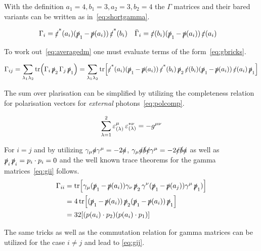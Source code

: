 With the definition \(a_1=4,b_1=3,a_2=3,b_2=4\) the \(\Gamma\)
matrices and their bared variants can be written as in~\eqref{eq:shortgamma}.

\begin{align}
  \label{eq:shortgamma}
  \Gamma_i &= \pses(a_i)(\ps_1 - \ps(a_i))\pses(b_i) & \bar{\Gamma}_i &= \pes(b_i)(\ps_1 - \ps(a_i))\pes(a_i)
\end{align}

To work out~\eqref{eq:averagedm} one must evaluate terms of the
form~\eqref{eq:gbricks}.

\begin{align}
  \label{eq:gbricks}
  \Gamma_{ij} = \sum_{\lambda_1\lambda_2} \tr(\Gamma_i\ps_2\Gamma_j\ps_1) =
  \sum_{\lambda_1\lambda_2} \tr[\pses(a_i)(\ps_1-\ps(a_i))\pses(b_i)\ps_2\pes(b_i)(\ps_1 - \ps(a_i))\pes(a_i)\ps_1]
\end{align}

The sum over plarisation can be simplified by utilizing the
completeness relation for polarisation vectors for \emph{external}
photons~\eqref{eq:polcomp}.

\begin{equation}
  \label{eq:polcomp}
  \sum_{\lambda=1}^{2}\pe_{(\lambda)}^\mu\pe_{(\lambda)}^{*\nu} = -g^{\mu\nu}
\end{equation}

For \(i=j\) and by utilizing \(\gamma_\mu\sl{a}\gamma^\mu=-2\sl{a}\),
 \(\gamma_\mu\sl{a}\sl{b}\sl{c}\gamma^\mu=-2\sl{c}\sl{b}\sl{a}\) as
well as \(\ps_i\ps_i=p_i\cdot p_i = 0\) and the well known trace
theorems for the gamma matrices~\eqref{eq:gii} follows.
\begin{equation}
  \label{eq:gii}
  \begin{split}
\Gamma_{ii} &=
\tr[\gamma_\mu(\ps_1-\ps(a_i))\gamma_\nu\ps_2\gamma^\nu(\ps_1-\ps(a_j))\gamma^\mu\ps_1)]
\\
&= 4\tr[(\ps_1-\ps(a_i))\ps_2(\ps_1-\ps(a_i))\ps_1]\\
&= 32\qty[(p(a_i)\cdot p_2)(p(a_i)\cdot p_1)]
\end{split}
\end{equation}

The same tricks as well as the commutation relation for gamma matrices
can be utilized for the case \(i\neq j\) and lead to
\ref{eq:gij}.

